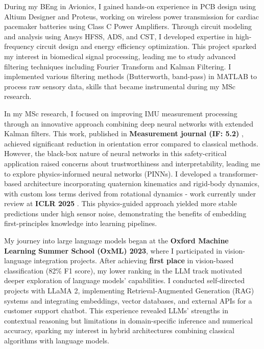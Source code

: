 \documentclass[a4,10pt]{article}
\begin{document}
\begin{large}
\par
\vspace{-0.25cm} \quad During my BEng in Avionics, I gained hands-on experience in PCB design using Altium Designer and Proteus, working on wireless power transmission for cardiac pacemaker batteries using Class C Power Amplifiers. Through circuit modeling and analysis using Ansys HFSS, ADS, and CST, I developed expertise in high-frequency circuit design and energy efficiency optimization. This project sparked my interest in biomedical signal processing, leading me to study advanced filtering techniques including Fourier Transform and Kalman Filtering. I implemented various filtering methods (Butterworth, band-pass) in MATLAB to process raw sensory data, skills that became instrumental during my MSc research.
\par
\vspace{-0.25cm} \quad In my MSc research, I focused on improving IMU measurement processing through an innovative approach combining deep neural networks with extended Kalman filters. This work, published in \textbf{Measurement journal (IF: 5.2) }\cite{golroudbari2023generalizable}, achieved significant reduction in orientation error compared to classical methods. However, the black-box nature of neural networks in this safety-critical application raised concerns about trustworthiness and interpretability, leading me to explore physics-informed neural networks (PINNs). I developed a transformer-based architecture incorporating quaternion kinematics and rigid-body dynamics, with custom loss terms derived from rotational dynamics - work currently under review at \textbf{ICLR 2025} \cite{golroudbari2024te}. This physics-guided approach yielded more stable predictions under high sensor noise, demonstrating the benefits of embedding first-principles knowledge into learning pipelines.
\par
\vspace{-0.25cm} \quad My journey into large language models began at the \textbf{Oxford Machine Learning Summer School (OxML) 2023}, where I participated in vision-language integration projects. After achieving \textbf{first place} in vision-based classification (82\% F1 score), my lower ranking in the LLM track motivated deeper exploration of language models' capabilities. I conducted self-directed projects with LLaMA 2, implementing Retrieval-Augmented Generation (RAG) systems and integrating embeddings, vector databases, and external APIs for a customer support chatbot. This experience revealed LLMs' strengths in contextual reasoning but limitations in domain-specific inference and numerical accuracy, sparking my interest in hybrid architectures combining classical algorithms with language models.

\end{large}
\end{document}
